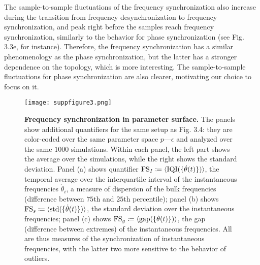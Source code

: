 The sample-to-sample fluctuations of the frequency synchronization also increase during the transition from frequency desynchronization to frequency synchronization, and peak right before the samples reach frequency synchronization, similarly to the behavior for phase synchronization (see Fig. 3.3e, for instance). Therefore, the frequency synchronization has a similar phenomenology as the phase synchronization, but the latter has a stronger dependence on the topology, which is more interesting. The sample-to-sample fluctuations for phase synchronization are also clearer, motivating our choice to focus on it.


%
\begin{figure*}[htb]
    \centering
    \texttt{[image: suppfigure3.png]}
    \caption{\textbf{Frequency synchronization in parameter surface.}  The panels show additional quantifiers for the same setup as Fig. 3.4: they are color-coded over the same parameter space $p \text{---} \epsilon$ and analyzed over the same $1000$ simulations. Within each panel, the left part shows the average over the simulations, while the right shows the standard deviation. Panel (a) shows quantifier $\mathrm{FS}_I \coloneqq \langle \mathrm{IQI}(\{\dot{\theta}(t)\}) \rangle$, the temporal average over the interquartile interval of the instantaneous frequencies $\dot{\theta}_i$, a measure of dispersion of the bulk frequencies (difference between $75$th and $25$th percentile); panel (b) shows $\mathrm{FS}_s \coloneqq \langle \mathrm{std}(\{\dot{\theta}(t)\}) \rangle$, the standard deviation over the instantaneous frequencies; panel (c) shows $\mathrm{FS}_g \coloneqq \langle \mathrm{gap}(\{\dot{\theta}(t)\}) \rangle$, the gap (difference between extremes) of the instantaneous frequencies. All are thus measures of the synchronization of instantaneous frequencies, with the latter two more sensitive to the behavior of outliers.
    }
    \label{sup:fig:additionalsurfaces}
\end{figure*}

